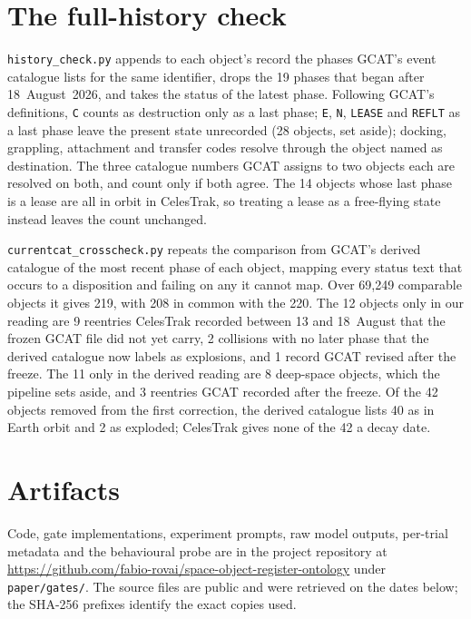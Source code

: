 \section{The full-history check}
\label{app:history}

\texttt{history\_check.py} appends to each object's record the phases GCAT's
event catalogue lists for the same identifier, drops the 19 phases that began
after 18~August~2026, and takes the status of the latest phase. Following GCAT's
definitions, \texttt{C} counts as destruction only as a last phase; \texttt{E},
\texttt{N}, \texttt{LEASE} and \texttt{REFLT} as a last phase leave the present
state unrecorded (28 objects, set aside); docking, grappling, attachment and
transfer codes resolve through the object named as destination. The three
catalogue numbers GCAT assigns to two objects each are resolved on both, and
count only if both agree. The 14 objects whose last phase is a lease are all in
orbit in CelesTrak, so treating a lease as a free-flying state instead leaves the
count unchanged.

\texttt{currentcat\_crosscheck.py} repeats the comparison from GCAT's derived
catalogue of the most recent phase of each object, mapping every status text
that occurs to a disposition and failing on any it cannot map. Over 69,249
comparable objects it gives 219, with 208 in common with the 220. The 12 objects
only in our reading are 9 reentries CelesTrak recorded between 13 and 18~August
that the frozen GCAT file did not yet carry, 2 collisions with no later phase
that the derived catalogue now labels as explosions, and 1 record GCAT revised
after the freeze. The 11 only in the derived reading are 8 deep-space objects,
which the pipeline sets aside, and 3 reentries GCAT recorded after the freeze.
Of the 42 objects removed from the first correction, the derived catalogue lists
40 as in Earth orbit and 2 as exploded; CelesTrak gives none of the 42 a decay
date.



\section{Artifacts}
\label{app:artifacts}

Code, gate implementations, experiment prompts, raw model outputs, per-trial
metadata and the behavioural probe are in the project repository at
\url{https://github.com/fabio-rovai/space-object-register-ontology} under
\texttt{paper/gates/}. The source files are public and were retrieved on the dates
below; the SHA-256 prefixes identify the exact copies used.

